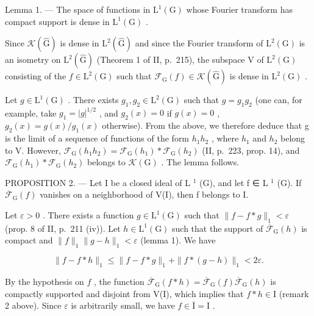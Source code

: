 Lemma 1. --- The space of functions in \(\mathrm{L}^{1}(\mathrm{G})\) whose Fourier transform has compact support is dense in \(\mathrm{L}^{1}(\mathrm{G})\) .

Since \(\mathcal{K}(\widehat{\mathrm{G}})\) is dense in \(\mathrm{L}^2 (\widehat{\mathrm{G}})\) and since the Fourier transform of \(\mathrm{L}^2 (\mathrm{G})\) is an isometry on \(\mathrm{L}^2 (\widehat{\mathrm{G}})\) (Theorem 1 of II, p.~215), the subspace V of \(\mathrm{L}^2 (\mathrm{G})\) consisting of the \(f\in \mathrm{L}^2 (\mathrm{G})\) such that \(\mathcal{F}_{\mathrm{G}}(f)\in \mathcal{K}(\widehat{\mathrm{G}})\) is dense in \(\mathrm{L}^2 (\mathrm{G})\) .

Let \(g \in \mathrm{L}^{1}(\mathrm{G})\) . There exists \(g_{1}, g_{2} \in \mathrm{L}^{2}(\mathrm{G})\) such that \(g = g_{1}g_{2}\) (one can, for example, take \(g_{1} = |g|^{1/2}\) , and \(g_{2}(x) = 0\) if \(g(x) = 0\) , \(g_{2}(x) = g(x)/g_{1}(x)\) otherwise). From the above, we therefore deduce that g is the limit of a sequence of functions of the form \(h_{1}h_{2}\) , where \(h_{1}\) and \(h_{2}\) belong to V. However, \(\mathcal{F}_{\mathrm{G}}(h_{1}h_{2}) = \mathcal{F}_{\mathrm{G}}(h_{1}) * \mathcal{F}_{\mathrm{G}}(h_{2})\) (II, p.~223, prop. 14), and \(\mathcal{F}_{\mathrm{G}}(h_{1}) * \mathcal{F}_{\mathrm{G}}(h_{2})\) belongs to \(\mathcal{K}(\mathrm{G})\) . The lemma follows.

PROPOSITION 2. --- Let I be a closed ideal of L \(^{1}\) (G), and let f ∈ L \(^{1}\) (G). If \(\overline{\mathcal{F}}_{\text{G}}(f)\) vanishes on a neighborhood of V(I), then f belongs to I.

Let \(\varepsilon > 0\) . There exists a function \(g \in \mathrm{L}^1(\mathrm{G})\) such that \(\|f - f * g\|_1 < \varepsilon\) (prop. 8 of II, p.~211 (iv)). Let \(h \in \mathrm{L}^1(\mathrm{G})\) such that the support of \(\overline{\mathcal{F}}_{\mathrm{G}}(h)\) is compact and \(\|f\|_1 \|g - h\|_1 < \varepsilon\) (lemma 1). We have

\[
\| f - f * h \| _ {1} \leqslant \| f - f * g \| _ {1} + \| f * (g - h) \| _ {1} <   2 \varepsilon .
\]

By the hypothesis on \(f\) , the function \(\overline{\mathcal{F}}_{\mathrm{G}}(f*h)=\overline{\mathcal{F}}_{\mathrm{G}}(f)\overline{\mathcal{F}}_{\mathrm{G}}(h)\) is compactly supported and disjoint from V(I), which implies that \(f*h\in\mathrm{I}\) (remark 2 above). Since \(\varepsilon\) is arbitrarily small, we have \(f\in\overline{\mathrm{I}}=\mathrm{I}\) .

